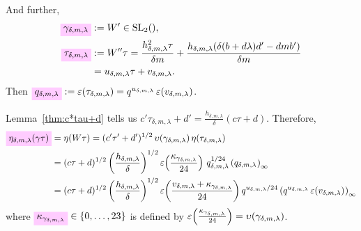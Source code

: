 \documentclass{article}
\begin{document}
And further,
\begin{align}
  \defineNotation[gamma-delta-m-lambda]{\gamma_{\delta,m,\lambda}}
  &:=
    W'\in\SL2Z,
    \label{eq:gamma_delta-m-lambda}
  \\
  \defineNotation[tau-delta-m-lambda]{\tau_{\delta,m,\lambda}}
  &:=
    W''\tau
    = \frac{h_{\delta,m,\lambda}^2 \tau}{\delta m} +
    \frac{h_{\delta,m,\lambda}(\delta (b + d \lambda) d' - d m
    b')}{\delta m}
  \notag\\
    &= u_{\delta,m,\lambda} \tau + v_{\delta,m,\lambda}.
  \label{eq:tau_delta-m-lambda}
\end{align}
Then
$\defineNotation[q-delta-m-lambda]{q_{\delta,m,\lambda}} :=
\unityPower{\tau_{\delta,m,\lambda}} =
q^{u_{\delta,m,\lambda}}\,\unityPower{v_{\delta,m,\lambda}}$.


Lemma~\ref{thm:c*tau+d} tells us
$c'\tau_{\delta,m,\lambda}+d' = \frac{h_{\delta,m,\lambda}}{\delta} (c \tau + d)$.
%
Therefore,
\begin{align}
  \defineNotation[eta-delta-m-lambda-gamma-tau]{\eta_{\delta,m,\lambda}(\gamma \tau)}
  &= \eta(W \tau)
    = (c'\tau'+d')^{1/2} \, \upsilon(\gamma_{\delta,m,\lambda})
    \,\eta(\tau_{\delta,m,\lambda})\notag\\
  &=
    (c\tau+d)^{1/2}
    \left(\frac{h_{\delta,m,\lambda}}{\delta}\right)^{1/2}
    \unityPower{\frac{\kappa_{\gamma_{\delta,m,\lambda}}}{24}} \,
    q_{\delta,m,\lambda}^{1/24}
    \eulerFunction[q_{\delta,m,\lambda}]{}\notag\\
  &=
    (c\tau+d)^{1/2}
    \left(\frac{h_{\delta,m,\lambda}}{\delta}\right)^{1/2}
    \unityPower{\frac{ v_{\delta,m,\lambda} + \kappa_{\gamma_{\delta,m,\lambda}}}{24}}
    q^{u_{\delta,m,\lambda}/24}
    \eulerFunction[q^{u_{\delta,m,\lambda}}\,\unityPower{v_{\delta,m,\lambda}}]{}
    \label{eq:eta_delta-m-lambda(gamma*tau)}
\end{align}
where
$\defineNotation[kappa-gamma-delta-m-lambda]{\kappa_{\gamma_{\delta,m,\lambda}}}
\in \Set{0,\ldots,23}$ is defined by
$\varepsilon\!\left(\frac{\kappa_{\gamma_{\delta,m,\lambda}}}{24}\right) =
\upsilon(\gamma_{\delta,m,\lambda})$.
\end{document}
